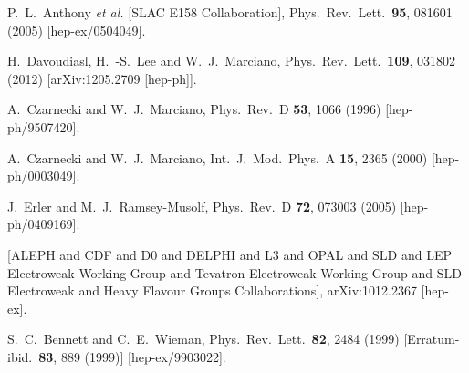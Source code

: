 \begin{thebibliography}{99}
  P.~L.~Anthony {\it et al.}  [SLAC E158 Collaboration],
  Phys.\ Rev.\ Lett.\  {\bf 95}, 081601 (2005)
  [hep-ex/0504049].

  H.~Davoudiasl, H.~-S.~Lee and W.~J.~Marciano,
  Phys.\ Rev.\ Lett.\  {\bf 109}, 031802 (2012)
  [arXiv:1205.2709 [hep-ph]].

  A.~Czarnecki and W.~J.~Marciano,
  Phys.\ Rev.\ D {\bf 53}, 1066 (1996)
  [hep-ph/9507420].

  A.~Czarnecki and W.~J.~Marciano,
  Int.\ J.\ Mod.\ Phys.\ A {\bf 15}, 2365 (2000)
  [hep-ph/0003049].
  
  J.~Erler and M.~J.~Ramsey-Musolf,
  Phys.\ Rev.\ D {\bf 72}, 073003 (2005)
  [hep-ph/0409169].

  [ALEPH and CDF and D0 and DELPHI and L3 and OPAL and SLD and LEP Electroweak Working Group and Tevatron Electroweak Working Group and SLD Electroweak and Heavy Flavour Groups Collaborations],
  arXiv:1012.2367 [hep-ex].

  S.~C.~Bennett and C.~E.~Wieman,
  Phys.\ Rev.\ Lett.\  {\bf 82}, 2484 (1999)
  [Erratum-ibid.\  {\bf 83}, 889 (1999)]
  [hep-ex/9903022].


\end{thebibliography}
